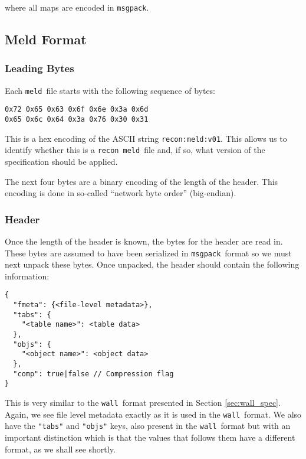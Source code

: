 \documentclass[11pt,a4paper,twocolumn]{article}
\newcommand{\recon}{\texttt{recon}}
\newcommand{\wall}{\texttt{wall}}
\newcommand{\meld}{\texttt{meld}}
\newcommand{\msgpack}{\texttt{msgpack}}
\newcommand{\code}[1]{\texttt{#1}} %
\begin{document}
where all maps are encoded in \msgpack.

\subsection{Meld Format}
\label{sec:meld_spec}

\subsubsection{Leading Bytes}

Each \meld\ file starts with the following sequence of bytes:

\begin{verbatim}
0x72 0x65 0x63 0x6f 0x6e 0x3a 0x6d
0x65 0x6c 0x64 0x3a 0x76 0x30 0x31
\end{verbatim}

This is a hex encoding of the ASCII string \code{recon:meld:v01}.
This allows us to identify whether this is a \recon\ \meld\ file and, if
so, what version of the specification should be applied.

The next four bytes are a binary encoding of the length of the header.
This encoding is done in so-called ``network byte order''
(big-endian).

\subsubsection{Header}
\label{sec:meld_head}

Once the length of the header is known, the bytes for the header are
read in.  These bytes are assumed to have been serialized in
\msgpack\ format so we must next unpack these bytes.  Once unpacked,
the header should contain the following information:

\begin{verbatim}
{
  "fmeta": {<file-level metadata>},
  "tabs": {
    "<table name>": <table data>
  },
  "objs": {
    "<object name>": <object data>
  },
  "comp": true|false // Compression flag
}
\end{verbatim}

This is very similar to the \wall\ format presented in Section
\ref{sec:wall_spec}.  Again, we see file level metadata exactly as it
is used in the \wall\ format.  We also have the \code{"tabs"} and
\code{"objs"} keys, also present in the \wall\ format but with an
important distinction which is that the values that follows them have
a different format, as we shall see shortly.
\end{document}
